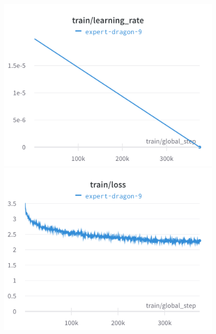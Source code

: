 \documentclass{article}
\begin{document}
\begin{figure}[!htb]
\includegraphics[width=\linewidth]{charts/Section-4-Panel-0-nnuz777qv}
\caption{}
\endminipage\hfill
{}
\includegraphics[width=\linewidth]{charts/Section-4-Panel-1-kpudr02oo}
\caption{}
\endminipage
\end{figure}
\end{document}

